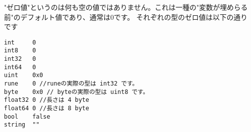 "ゼロ値"というのは何も空の値ではありません。これは一種の"変数が埋めらる前"のデフォルト値であり、通常は0です。 それぞれの型のゼロ値は以下の通りです


\begin{lstlisting}[numbers=none]
int     0
int8    0
int32   0
int64   0
uint    0x0
rune    0 //runeの実際の型は int32 です。
byte    0x0 // byteの実際の型は uint8 です。
float32 0 //長さは 4 byte
float64 0 //長さは 8 byte
bool    false
string  ""
\end{lstlisting}
